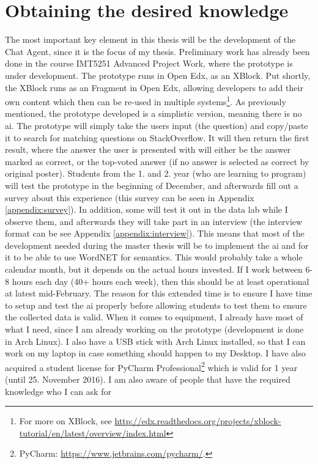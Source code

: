 \section{Obtaining the desired knowledge}
\label{chapter5:desired_knowledge}
The most important key element in this thesis will be the development of the Chat Agent, since it is the focus of my thesis. Preliminary work has already been done in the course 
IMT5251 Advanced Project Work, where the prototype is under development. The prototype runs in Open Edx, as an XBlock. Put shortly, the XBlock runs as an Fragment in Open Edx, 
allowing developers to add their own content which then can be re-used in multiple systems\footnote{For more on XBlock, see 
\url{http://edx.readthedocs.org/projects/xblock-tutorial/en/latest/overview/index.html}}. As previously mentioned, the prototype developed is a simplistic version, meaning there is no 
\gls{ai}. The prototype will simply take the users input (the question) and copy/paste it to search for matching questions on StackOverflow. It will then return the first result, where 
the answer the user is presented with will either be the answer marked as correct, or the top-voted answer (if no answer is selected as correct by original poster). Students from the 
1. and 2. year (who are learning to program) will test the prototype in the beginning of December, and afterwards fill out a survey about this experience (this survey can be seen in 
 Appendix \ref{appendix:survey}). In addition, some will test it out in the data lab while I observe them, and afterwards they will take part in an interview (the interview format can be 
see Appendix \ref{appendix:interview}).
\vspace{0.5em}\newline
This means that most of the development needed during the master thesis will be to implement the \gls{ai} and for it to be able to use WordNET for semantics. This would probably take 
a whole calendar month, but it depends on the actual hours invested. If I work between 6-8 hours each day (40+ hours each week), then this should be at least operational at latest 
mid-February. The reason for this extended time is to ensure I have time to setup and test the \gls{ai} properly before allowing students to test them to ensure the collected data is 
valid. When it comes to equipment, I already have most of what I need, since I am already working on the prototype (development is done in Arch Linux). I also have a USB stick 
with Arch Linux installed, so that I can work on my laptop in case something should happen to my Desktop. I have also acquired a student license for PyCharm Professional\footnote{
PyCharm: \url{https://www.jetbrains.com/pycharm/}.} which is valid for 1 year (until 25. November 2016). I am also aware of people that have the required knowledge who I can ask for 
